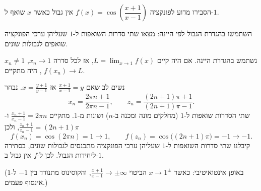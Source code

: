 
\begin{question}
הסבירו מדוע לפונקציה $f(x)=\cos\left(\dfrac{x+1}{x-1}\right)$ אין גבול כאשר $x$ שואף ל-$1$.
\end{question}

\begin{hint}
השתמשו בהגדרת הגבול לפי היינה: מצאו שתי סדרות השואפות ל-$1$ שעליהן ערכי הפונקציה שואפים לגבולות שונים.
\end{hint}

\begin{solution}
נשתמש בהגדרת היינה. אם היה קיים $L=\lim_{x\to1}f(x)$, אז לכל סדרה $x_n\to1$, $x_n\ne1$, היה מתקיים $f(x_n)\to L$.

נשים לב שאם $\frac{x+1}{x-1}=y$ אז $x=\frac{y+1}{y-1}$. נבחר
\[ x_n=\frac{2\pi n+1}{2\pi n-1},\qquad z_n=\frac{(2n+1)\pi+1}{(2n+1)\pi-1}. \]
שתי הסדרות שואפות ל-$1$ (מחלקים מונה ומכנה ב-$n$) ושונות מ-$1$. מתקיים $\frac{x_n+1}{x_n-1}=2\pi n$ ו-$\frac{z_n+1}{z_n-1}=(2n+1)\pi$, ולכן
\[ f(x_n)=\cos(2\pi n)=1\to1,\qquad f(z_n)=\cos\big((2n+1)\pi\big)=-1\to-1. \]
קיבלנו שתי סדרות השואפות ל-$1$ שעליהן ערכי הפונקציה מתכנסים לגבולות שונים, בסתירה ליחידות הגבול. לכן ל-$f$ אין גבול ב-$1$.

(באופן אינטואיטיבי: כאשר $x\to1^\pm$ הביטוי $\frac{x+1}{x-1}\to\pm\infty$, והקוסינוס מתנודד בין $-1$ ל-$1$ אינסוף פעמים.)
\end{solution}
